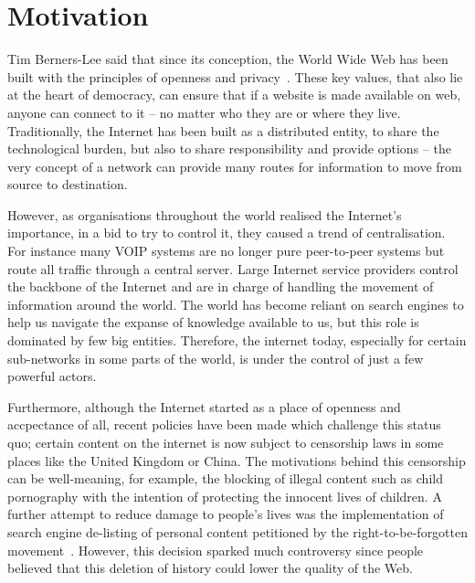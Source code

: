 \documentclass[ %
                    author={Samuel Russell},
                supervisor={Prof. Bogdan Warinschi},
                    degree={MEng},
                     title={Innocuous Ciphertexts},
                  subtitle={The DE-CENSOR Scheme},
                      type={research},
                      year={2018} ]{dissertation}
\begin{document}

\chapter{Motivation}
\label{chap:context}

Tim Berners-Lee said that since its conception, the World Wide Web has been built with the principles of openness and privacy~\cite{gard}.
These key values, that also lie at the heart of democracy, can ensure that if a website is made available on web, anyone can connect to it -- no matter who they are or where they live. 
Traditionally, the Internet has been built as a distributed entity, to share the technological burden, but also to share responsibility and provide options -- the very concept of a network can provide many routes for information to move from source to destination.

However, as organisations throughout the world realised the Internet's importance, in a bid to try to control it, they caused a trend of centralisation.
For instance many VOIP systems are no longer pure peer-to-peer systems but route all traffic through a central server.
Large Internet service providers control the backbone of the Internet and are in charge of handling the movement of information around the world.
The world has become reliant on search engines to help us navigate the expanse of knowledge available to us, but this role is dominated by few big entities.
Therefore, the internet today, especially for certain sub-networks in some parts of the world, is under the control of just a few powerful actors. 

Furthermore, although the Internet started as a place of openness and accpectance of all, recent policies have been made which challenge this status quo; certain content on the internet is now subject to censorship laws in some places like the United Kingdom or China. The motivations behind this censorship can be well-meaning, for example, the blocking of illegal content such as child pornography with the intention of protecting the innocent lives of children. A further attempt to reduce damage to people's lives was the implementation of search engine de-listing of personal content petitioned by the right-to-be-forgotten movement~\cite{rtbf}. However, this decision sparked much controversy since people believed that this deletion of history could lower the quality of the Web. 
\end{document}
